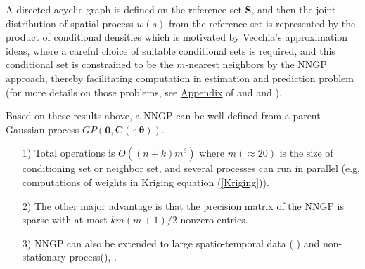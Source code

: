 \documentclass[
12pt, %
a4paper, %
oneside, %
headinclude,footinclude, %
BCOR5mm, %
]{scrartcl}
\begin{document}
A directed acyclic graph is defined on the reference set $\boldsymbol{S}$, and then the joint distribution of spatial process $w(s)$ from the reference set is represented by the product of conditional densities which is motivated by Vecchia’s approximation \citep{vecchia1988estimation} ideas, where a careful choice of suitable conditional sets is required, and this conditional set is constrained to be the $m$-nearest neighbors by the NNGP approach, thereby facilitating computation in estimation and prediction problem (for more details on those problems, see  \href{https://chenyw68.github.io/Literature/[2016]Hierarchical nearest-neighbor Gaussian process models for large geostatistical datasets-Appdix.pdf}{Appendix} of \href{https://chenyw68.github.io/Literature/[2016]Hierarchical nearest-neighbor Gaussian process models for large geostatistical datasets.pdf}{\cite{datta2016hierarchical}} and \href{https://chenyw68.github.io/Literature/[2017]Applying Nearest Neighbor Gaussian Processes to Massive Spatial Data Sets.pdf}{\citep{finley2017applying}} and \href{https://chenyw68.github.io/Literature/[2019]Efficient algorithms for bayesian nearest neighbor gaussian processes.pdf}{\cite{finley2019efficient}}).

Based on these results above, a NNGP can be well-defined from a parent Gaussian process $GP(\boldsymbol{0}, \boldsymbol{C\left(\cdot; \boldsymbol{\theta}\right)})$.


\begin{itemize}
 \item [1)] Total operations is $O((n + k)m^3)$ where $m (\approx 20)$ is the size of conditioning set or neighbor set, and several processes can run in parallel (e.g, computations of weights in Kriging equation (\ref{Kriging})).
 \item [2)] The other major advantage is that the precision matrix of the NNGP is sparse with at most $km(m + 1)/2$ nonzero entries.
 \item [3)] NNGP can also be extended to large spatio-temporal data (
\href{https://chenyw68.github.io/Literature/[2016]Nonseparable dynamic NNGP models for large spatio-temporal data.pdf}{\cite{datta2016nonseparable}}) and non-stationary process(\href{https://chenyw68.github.io/Literature/[2020]Computationally efficient nonstationary NNGP models using data-driven techniques.pdf}{\cite{konomi2019computationally}}), \href{https://chenyw68.github.io/Literature/[2020-formal]Bayesian inference for high dimensional nonstationary Gaussian processes.pdf}{\citep{risser2020bayesian}}.
\end{itemize}
\end{document}
